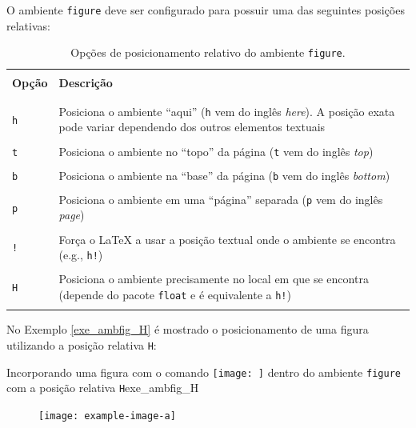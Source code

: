 O ambiente {\tt figure} deve ser configurado para possuir uma das seguintes posições relativas:

\begin{table}[H]
\centering
\caption{Opções de posicionamento relativo do ambiente {\tt figure}.}
\label{tab:ambfig}
    \begin{tabular}{p{2cm}p{11cm}}
    \hline
    \\[-0.5em]
    \textbf{Opção} & \textbf{Descrição} \\
    \\[-0.5em]
    \hline
    \hline
    \\[-0.5em]
    {\tt h} & Posiciona o ambiente ``aqui'' ({\tt h} vem do inglês \textit{here}). A posição exata pode variar dependendo dos outros elementos textuais \\
    \\[-0.5em]
    {\tt t} & Posiciona o ambiente no ``topo'' da página ({\tt t} vem do inglês \textit{top}) \\
    \\[-0.5em]
    {\tt b} & Posiciona o ambiente na ``base'' da página ({\tt b} vem do inglês \textit{bottom}) \\
    \\[-0.5em]
    {\tt p} & Posiciona o ambiente em uma ``página'' separada ({\tt p} vem do inglês \textit{page}) \\
    \\[-0.5em]
    {\tt !} & Força o \LaTeX{} a usar a posição textual onde o ambiente se encontra (e.g., {\tt h!}) \\
    \\[-0.5em]
    {\tt H} & Posiciona o ambiente precisamente no local em que se encontra (depende do pacote {\tt float} e é equivalente a {\tt h!}) \\
    \\[-0.5em]
    \hline
    \end{tabular}
\end{table}

No Exemplo \ref{exe_ambfig_H} é mostrado o posicionamento de uma figura utilizando a posição relativa {\tt H}:

\begin{texexptitled}[breakable,enhanced,middle=2mm]{Incorporando uma figura com o comando \texttt{\texttt{[image: ]}} dentro do ambiente {\tt figure} com a posição relativa {\tt H}}{exe_ambfig_H}
\lipsum[1]
\begin{figure}[H]
\texttt{[image: example-image-a]}
\end{figure}
\lipsum[2]
\end{texexptitled}

